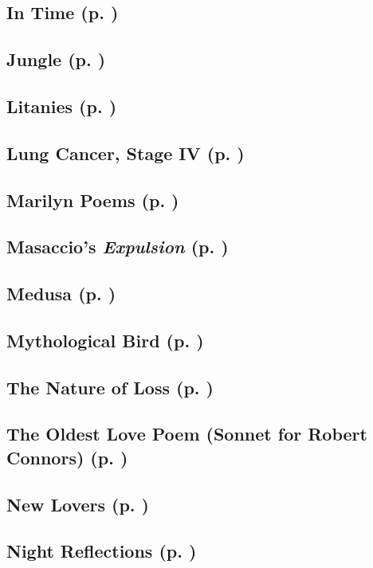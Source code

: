 \subsection*{In Time (p. \pageref{ch:in_time})}
\subsection*{Jungle (p. \pageref{ch:jungle})}
\subsection*{Litanies (p. \pageref{ch:litanies})}
\subsection*{Lung Cancer, Stage IV (p. \pageref{ch:lung_cancer})}
\subsection*{Marilyn Poems (p. \pageref{ch:marilyn_poems})}
\subsection*{Masaccio's \textit{Expulsion} (p. \pageref{ch:masaccio})}
\subsection*{Medusa (p. \pageref{ch:medusa})}
\subsection*{Mythological Bird (p. \pageref{ch:mythological_bird})}
\subsection*{The Nature of Loss (p. \pageref{ch:the_nature_of_loss})}
\subsection*{The Oldest Love Poem (Sonnet for Robert Connors) (p. \pageref{ch:the_oldest_love_poem})}
\subsection*{New Lovers (p. \pageref{ch:new_lovers})}
\subsection*{Night Reflections (p. \pageref{ch:night_reflections})}
